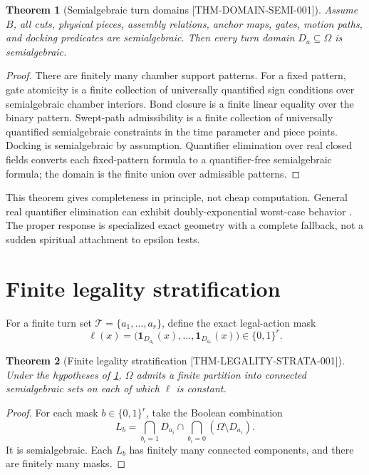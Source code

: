 \documentclass[11pt,openany]{book}
\newcommand{\States}{\Omega}
\newcommand{\Turns}{\mathcal T}
\newcommand{\claimid}[1]{\textnormal{\sffamily\footnotesize[#1]}}
\theoremstyle{polyplain}
\newtheorem{theorem}{Theorem}[chapter]
\theoremstyle{polydef}
\begin{document}
\begin{theorem}[Semialgebraic turn domains \claimid{THM-DOMAIN-SEMI-001}]
\label{thm:semialgebraic-turn-domain}
Assume $B$, all cuts, physical pieces, assembly relations, anchor maps, gates, motion paths, and docking predicates are semialgebraic. Then every turn domain $D_a\subseteq\States$ is semialgebraic.
\end{theorem}

\begin{proof}
There are finitely many chamber support patterns. For a fixed pattern, gate atomicity is a finite collection of universally quantified sign conditions over semialgebraic chamber interiors. Bond closure is a finite linear equality over the binary pattern. Swept-path admissibility is a finite collection of universally quantified semialgebraic constraints in the time parameter and piece points. Docking is semialgebraic by assumption. Quantifier elimination over real closed fields converts each fixed-pattern formula to a quantifier-free semialgebraic formula; the domain is the finite union over admissible patterns.
\end{proof}

This theorem gives completeness in principle, not cheap computation. General real quantifier elimination can exhibit doubly-exponential worst-case behavior \parencite{DavenportHeintz1988}. The proper response is specialized exact geometry with a complete fallback, not a sudden spiritual attachment to epsilon tests.

\section{Finite legality stratification}
\label{sec:legality-stratification}

For a finite turn set $\Turns=\{a_1,\ldots,a_r\}$, define the exact legal-action mask
\[
\ell(x)=\bigl(\mathbf 1_{D_{a_1}}(x),\ldots,\mathbf 1_{D_{a_r}}(x)\bigr)\in\{0,1\}^r.
\]

\begin{theorem}[Finite legality stratification \claimid{THM-LEGALITY-STRATA-001}]
\label{thm:finite-legality-stratification}
Under the hypotheses of \cref{thm:semialgebraic-turn-domain}, $\States$ admits a finite partition into connected semialgebraic sets on each of which $\ell$ is constant.
\end{theorem}

\begin{proof}
For each mask $b\in\{0,1\}^r$, take the Boolean combination
\[
L_b=\bigcap_{b_i=1}D_{a_i}\cap\bigcap_{b_i=0}(\States\setminus D_{a_i}).
\]
It is semialgebraic. Each $L_b$ has finitely many connected components, and there are finitely many masks.
\end{proof}
\end{document}
